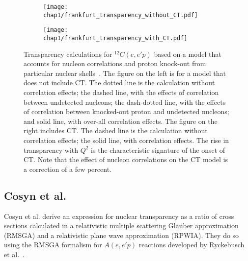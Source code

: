 \begin{figure}[h]
    \centering
    \begin{subfigure}[b]{0.45\textwidth}
        \centering
        \texttt{[image: chap1/frankfurt\_transparency\_without\_CT.pdf]}
        \label{fig:frankfurt_transparency_without_CT}
    \end{subfigure}
    \begin{subfigure}[b]{0.45\textwidth}
        \centering
        \texttt{[image: chap1/frankfurt\_transparency\_with\_CT.pdf]}
        \label{fig:frankfurt_transparency_with_CT}
    \end{subfigure}
    \caption[Transparency calculations for ${}^{12}C(e,e'p)$ based on a model
             that accounts for nucleon correlations and proton knock-out from
             particular nuclear shells~\cite{Frankfurt_1995_PRC}.]{Transparency calculations for ${}^{12}C(e,e'p)$ based on a model
             that accounts for nucleon correlations and proton knock-out from
             particular nuclear shells~\cite{Frankfurt_1995_PRC}.
             The figure on the left is for a model that does not include CT.
             The dotted line is the calculation without correlation effects;
             the dashed line, with the effects of correlation between undetected nucleons;
             the dash-dotted line, with the effects of correlation between knocked-out proton and undetected nucleons;
             and solid line, with over-all correlation effects.
             The figure on the right includes CT.
             The dashed line is the calculation without correlation effects;
             the solid line, with correlation effects.
             The rise in transparency with $Q^2$ is the characteristic
             signature of the onset of CT.
             Note that the effect of nucleon correlations on the CT model is
             a correction of a few percent.
             }
    \label{fig:frankfurt_transparency}
\end{figure}



\subsection{Cosyn et al.}

Cosyn et al. derive an expression for nuclear transparency as a ratio of cross
sections calculated in
a relativistic multiple scattering Glauber approximation (RMSGA)
and
a relativistic plane wave approximation (RPWIA).
They do so using the RMSGA formalism for $A(e,e'p)$ reactions developed by
Ryckebusch et al.~\cite{Ryckebusch_2003}.



